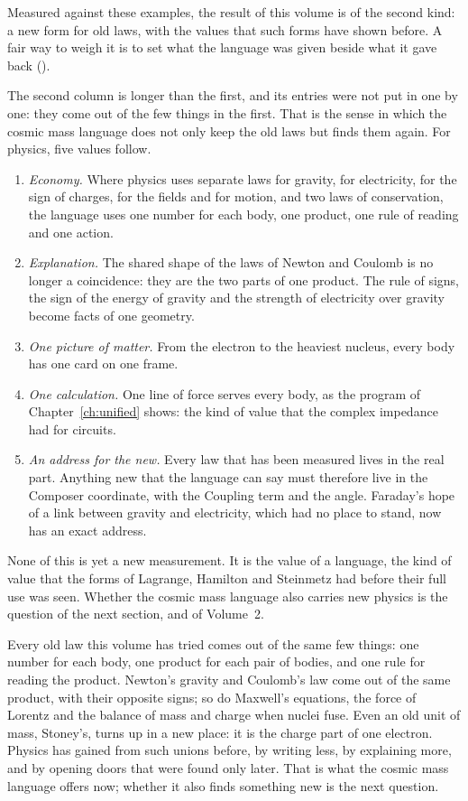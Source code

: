 Measured against these examples, the result of this volume is of the second kind: a new form for old laws, with the values that such forms have shown before. A fair way to weigh it is to set what the language was given beside what it gave back ().


The second column is longer than the first, and its entries were not put in one by one: they come out of the few things in the first. That is the sense in which the cosmic mass language does not only keep the old laws but finds them again. For physics, five values follow.
\begin{enumerate}
  \item \emph{Economy.} Where physics uses separate laws for gravity, for electricity, for the sign of charges, for the fields and for motion, and two laws of conservation, the language uses one number for each body, one product, one rule of reading and one action.
  \item \emph{Explanation.} The shared shape of the laws of Newton and Coulomb is no longer a coincidence: they are the two parts of one product. The rule of signs, the sign of the energy of gravity and the strength of electricity over gravity become facts of one geometry.
  \item \emph{One picture of matter.} From the electron to the heaviest nucleus, every body has one card on one frame.
  \item \emph{One calculation.} One line of force serves every body, as the program of Chapter~\ref{ch:unified} shows: the kind of value that the complex impedance had for circuits.
  \item \emph{An address for the new.} Every law that has been measured lives in the real part. Anything new that the language can say must therefore live in the Composer coordinate, with the Coupling term and the angle. Faraday's hope of a link between gravity and electricity, which had no place to stand, now has an exact address.
\end{enumerate}

None of this is yet a new measurement. It is the value of a language, the kind of value that the forms of Lagrange, Hamilton and Steinmetz had before their full use was seen. Whether the cosmic mass language also carries new physics is the question of the next section, and of Volume~2.

\begin{plainwords}
Every old law this volume has tried comes out of the same few things: one number for each body, one product for each pair of bodies, and one rule for reading the product. Newton's gravity and Coulomb's law come out of the same product, with their opposite signs; so do Maxwell's equations, the force of Lorentz and the balance of mass and charge when nuclei fuse. Even an old unit of mass, Stoney's, turns up in a new place: it is the charge part of one electron. Physics has gained from such unions before, by writing less, by explaining more, and by opening doors that were found only later. That is what the cosmic mass language offers now; whether it also finds something new is the next question.
\end{plainwords}

